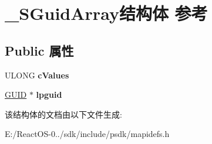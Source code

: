 \hypertarget{struct___s_guid_array}{}\section{\+\_\+\+S\+Guid\+Array结构体 参考}
\label{struct___s_guid_array}
\subsection*{Public 属性}
\begin{DoxyCompactItemize}
\item 
\mbox{\label{struct___s_guid_array_a81e4626036e3b2a47c80d381611c7537}} 
U\+L\+O\+NG {\bfseries c\+Values}
\item 
\mbox{\label{struct___s_guid_array_abfd0f1ece40c9c75d780e41cad1d2bfd}} 
\hyperlink{interface_g_u_i_d}{G\+U\+ID} $\ast$ {\bfseries lpguid}
\end{DoxyCompactItemize}


该结构体的文档由以下文件生成\+:\begin{DoxyCompactItemize}
\item 
E\+:/\+React\+O\+S-\/0../sdk/include/psdk/mapidefs.\+h\end{DoxyCompactItemize}
